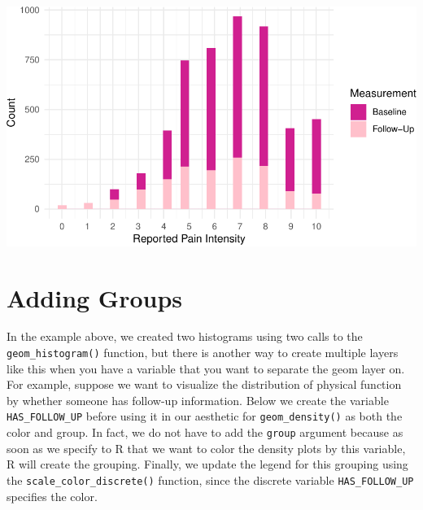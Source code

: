 \documentclass[
  letterpaper,
]{krantz}
\begin{document}
\begin{center}
\includegraphics[width=1\textwidth,height=\textheight]{book/visualization_ggplot_files/figure-pdf/unnamed-chunk-15-1.pdf}
\end{center}

\section{Adding Groups}\label{adding-groups}

In the example above, we created two histograms using two calls to the
\texttt{geom\_histogram()} function, but there is another way to create
multiple layers like this when you have a variable that you want to
separate the geom layer on. For example, suppose we want to visualize
the distribution of physical function by whether someone has follow-up
information. Below we create the variable \texttt{HAS\_FOLLOW\_UP}
before using it in our aesthetic for \texttt{geom\_density()} as both
the color and group. In fact, we do not have to add the \texttt{group}
argument because as soon as we specify to R that we want to color the
density plots by this variable, R will create the grouping. Finally, we
update the legend for this grouping using the
\texttt{scale\_color\_discrete()} function, since the discrete variable
\texttt{HAS\_FOLLOW\_UP} specifies the color.
\end{document}
